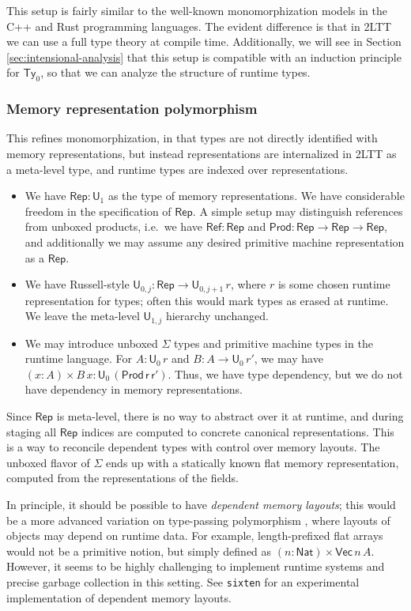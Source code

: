 \documentclass[acmsmall]{acmart}
\newcommand{\msf}[1]{\mathsf{#1}}
\renewcommand{\U}{\msf{U}}
\newcommand{\Ty}{\msf{Ty}}
\newcommand{\Nat}{\msf{Nat}}
\newcommand{\Rep}{\msf{Rep}}
\theoremstyle{remark}
\begin{document}
This setup is fairly similar to the well-known monomorphization models in the
C++ and Rust programming languages. The evident difference is that in 2LTT we
can use a full type theory at compile time. Additionally, we will see in Section
\ref{sec:intensional-analysis} that this setup is compatible with an induction principle for
$\Ty_0$, so that we can analyze the structure of runtime types.

\subsubsection{Memory representation polymorphism}

This refines monomorphization, in that types are not directly identified with
memory representations, but instead representations are internalized in 2LTT as
a meta-level type, and runtime types are indexed over representations.
\begin{itemize}
\item We have $\Rep : \U_1$ as the type of memory representations. We have
  considerable freedom in the specification of $\Rep$. A simple setup may
  distinguish references from unboxed products, i.e.\ we have $\msf{Ref} : \Rep$
  and $\msf{Prod} : \Rep \to \Rep \to \Rep$, and additionally we may assume
  any desired primitive machine representation as a $\Rep$.
\item We have Russell-style $\U_{0,j} : \Rep \to \U_{0, j+1}\,r$, where $r$ is
  some chosen runtime representation for types; often this would mark types as
  erased at runtime. We leave the meta-level $\U_{1,j}$ hierarchy unchanged.
\item We may introduce unboxed $\Sigma$ types and primitive machine types in the
  runtime language. For $A : \U_{0}\,r$ and $B : A \to \U_{0}\,r'$, we may have
  $(x : A) \times B\,x : \U_{0}\,(\msf{Prod\,r\,r'})$. Thus, we have
  type dependency, but we do not have dependency in memory representations.
\end{itemize}
Since $\Rep$ is meta-level, there is no way to abstract over it at runtime, and
during staging all $\Rep$ indices are computed to concrete canonical
representations. This is a way to reconcile dependent types with control over
memory layouts.  The unboxed flavor of $\Sigma$ ends up with a statically known
flat memory representation, computed from the representations of the fields.

In principle, it should be possible to have \emph{dependent memory layouts};
this would be a more advanced variation on type-passing polymorphism
\cite{intensional-poly}, where layouts of objects may depend on runtime data. For example,
length-prefixed flat arrays would not be a primitive notion, but simply defined
as $(n : \Nat) \times \msf{Vec}\,n\,A$. However, it seems to be highly
challenging to implement runtime systems and precise garbage collection in this
setting. See \texttt{sixten} \cite{sixten} for an experimental implementation of
dependent memory layouts.
\end{document}
